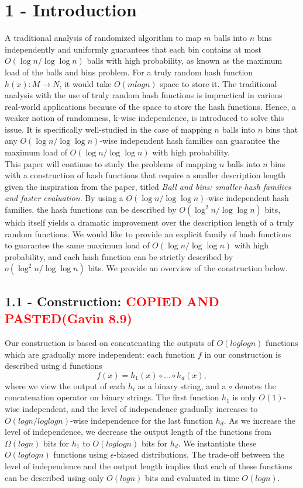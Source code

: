 \documentclass[letterpaper]{article} %
\begin{document}
	\section{1 - Introduction}
	A traditional analysis of randomized algorithm to map $m$ balls into $n$ bins independently and uniformly guarantees that each bin contains at most $O(\log n/\log\log n)$ balls with high probability, as known as the maximum load of the balls and bins problem. For a truly random hash function $h(x): M \rightarrow N$, it would take $O(mlogn)$ space to store it. The traditional analysis with the use of truly random hash functions is impractical in various real-world applications because of the space to store the hash functions. Hence, a weaker notion of randomness, k-wise independence, is introduced to solve this issue. It is specifically well-studied in the case of mapping $n$ balls into $n$ bins that any $O(\log n/\log\log n)$-wise independent hash families can guarantee the maximum load of $O(\log n/\log\log n)$ with high probability. \\
	\indent This paper will continue to study the problems of mapping $n$ balls into $n$ bins with a construction of hash functions that require a smaller description length given the inspiration from the paper, titled \textit{Ball and bins: smaller hash families and faster evaluation}. By using a $O(\log n/\log\log n)$-wise independent hash families, the hash functions can be described by $O(\log^2 n/\log\log n)$ bits, which itself yields a dramatic improvement over the description length of a truly random functions. We would like to provide an explicit family of hash functions to guarantee the same maximum load of $O(\log n/\log\log n)$ with high probability, and each hash function can be strictly described by $o(\log^2 n/\log\log n)$ bits. We provide an overview of the construction below.   \\
	
	\subsection{1.1 - Construction: \textcolor{red}{COPIED AND PASTED(Gavin 8.9)}}
	Our construction is based on concatenating the outputs of $O(log log n)$ functions which are gradually more independent: each function $f$ in our construction is described using d functions 
	$$f(x) = h_1(x) \circ ... \circ h_d(x),$$
	where we view the output of each $h_i$ as a binary string, and a $\circ$ denotes the concatenation operator on binary strings. The first function $h_1$ is only $O(1)$-wise independent, and the level of independence gradually increases to $O(log n/ log log n)$-wise independence for the last function $h_d$. As we increase the level of independence, we decrease the output length of the functions from $\Omega(log n)$ bits for $h_1$ to $O(log log n)$ bits for $h_d$. We instantiate these $O(log log n)$ functions using $\epsilon$-biased distributions. The trade-off between the level of independence and the output length implies that each of these functions can be described using only $O(log n)$ bits and evaluated in time $O(log n)$. \\
	
\end{document}
